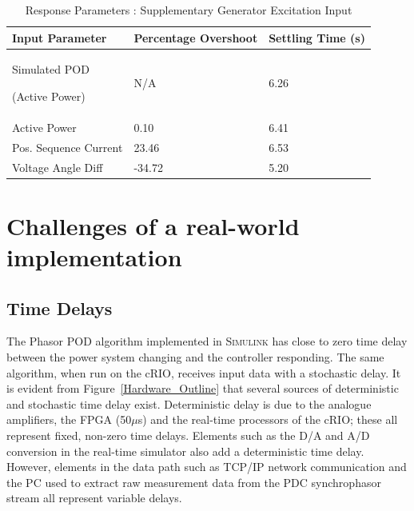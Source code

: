 \documentclass{ieeeaccess}
\begin{document}
\begin{table}[htp]
\caption{Response Parameters : Supplementary Generator Excitation Input}\label{GENResponseTable}
\begin{center}
\begin{tabular}{|p{80pt}|p{60pt}|p{60pt}|}
\hline \textbf{Input Parameter} & \textbf{Percentage Overshoot} & \textbf{Settling Time (s)} \\
\hline Simulated POD \par (Active Power) & N/A & 6.26\\ 
\hline Active Power & 0.10 & 6.41\\ 
\hline Pos. Sequence Current & 23.46 & 6.53 \\ 
\hline Voltage Angle Diff & -34.72 & 5.20 \\ 
\hline 
\end{tabular}
\end{center}
\end{table}

\section{Challenges of a real-world implementation}\label{Challenges}

\subsection{Time Delays}

The Phasor POD algorithm implemented in \textsc{Simulink} has close to zero time delay between the power system changing and the controller responding. The same algorithm, when run on the cRIO, receives input data with a stochastic delay. It is evident from Figure~\ref{Hardware_Outline} that several sources of deterministic and stochastic time delay exist. Deterministic delay is due to the analogue amplifiers, the FPGA (50$\mu$s) and the real-time processors of the cRIO; these all represent fixed, non-zero time delays. Elements such as the D/A and A/D conversion in the real-time simulator also add a deterministic time delay. However, elements in the data path such as TCP/IP network communication and the PC used to extract raw measurement data from the PDC synchrophasor stream all represent variable delays. 
\end{document}
